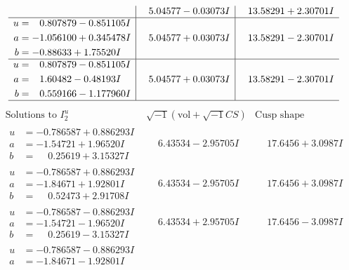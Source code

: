 \documentclass[1p]{elsarticle_modified}
\theoremstyle{definition}
\newcommand{\I}{\sqrt{-1}}
\begin{document}
$$\begin{array}{c|c|c}
 & \phantom{-}5.04577 - 0.03073 I & \phantom{-}13.58291 + 2.30701 I \\ \hline\begin{aligned}
u &= \phantom{-}0.807879 - 0.851105 I \\
a &= -1.056100 + 0.345478 I \\
b &= -0.88633 + 1.75520 I\end{aligned}
 & \phantom{-}5.04577 + 0.03073 I & \phantom{-}13.58291 - 2.30701 I \\ \hline\begin{aligned}
u &= \phantom{-}0.807879 - 0.851105 I \\
a &= \phantom{-}1.60482 - 0.48193 I \\
b &= \phantom{-}0.559166 - 1.177960 I\end{aligned}
 & \phantom{-}5.04577 + 0.03073 I & \phantom{-}13.58291 - 2.30701 I\\
 \hline 
 \end{array}$$\newpage$$\begin{array}{c|c|c}  
\text{Solutions to }I^u_{2}& \I (\text{vol} + \sqrt{-1}CS) & \text{Cusp shape}\\
 \hline 
\begin{aligned}
u &= -0.786587 + 0.886293 I \\
a &= -1.54721 + 1.96520 I \\
b &= \phantom{-}0.25619 + 3.15327 I\end{aligned}
 & \phantom{-}6.43534 - 2.95705 I & \phantom{-}17.6456 + 3.0987 I \\ \hline\begin{aligned}
u &= -0.786587 + 0.886293 I \\
a &= -1.84671 + 1.92801 I \\
b &= \phantom{-}0.52473 + 2.91708 I\end{aligned}
 & \phantom{-}6.43534 - 2.95705 I & \phantom{-}17.6456 + 3.0987 I \\ \hline\begin{aligned}
u &= -0.786587 - 0.886293 I \\
a &= -1.54721 - 1.96520 I \\
b &= \phantom{-}0.25619 - 3.15327 I\end{aligned}
 & \phantom{-}6.43534 + 2.95705 I & \phantom{-}17.6456 - 3.0987 I \\ \hline\begin{aligned}
u &= -0.786587 - 0.886293 I \\
a &= -1.84671 - 1.92801 I \\

\end{aligned}
\end{array}$$
\end{document}
